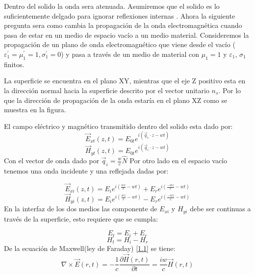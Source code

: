 \documentclass[a4paper,openright,12pt]{book}
\begin{document}
Dentro del solido la onda sera atenuada. Asumiremos que el solido es lo suficientemente delgado  para ignorar reflexiones internas \cite{SolidStatePhysics}. Ahora la siguiente pregunta sera como cambia la propagación de la onda electromagnética cuando pasa de estar en un medio de espacio vacío a un medio material. Consideremos la propagación de un plano de onda electromagnético que viene desde el vacío ($\varepsilon^{'}_{1}=\mu_{1}^{'}=1,\sigma_{1}^{'}=0$) y pasa a través de un medio de material con $\mu_{1}=1$ y $\varepsilon_{1}$, $\sigma_{1}$ finitos.

La superficie se encuentra en el plano XY, mientras que  el eje Z  positivo esta en la dirección normal hacia la superficie descrito por el vector unitario $n_{s}$. Por lo que la dirección de propagación de la onda estaría en el plano XZ como se muestra en la figura.

El campo eléctrico y magnético transmitido dentro del solido esta dado por:
\begin{equation}\label{Ei1}
\vec{E}_{xt}(z,t)=E_{0t}e^{i(\vec{q}_{i}\cdot z -wt)}
\end{equation}
\begin{equation}\label{Ei2}
\vec{H}_{yt}(z,t)=E_{0t}e^{i(\vec{q}_{i}\cdot z -wt)}
\end{equation}
Con el vector de onda dado por $\vec{q}_{i}=\frac{w}{c}\hat{N}$
Por otro lado en el espacio vacío tenemos una onda incidente y una reflejada dadas por:

\begin{equation}\label{Et1}
\vec{E}_{xi}(z,t)=E_{i}e^{i(\frac{wz}{c}-wt)}+E_{r}e^{i(\frac{-wz}{c}-wt)}
\end{equation}
\begin{equation}\label{Et2}
\vec{H}_{yi}(z,t)=E_{i}e^{i(\frac{wz}{c}-wt)}-E_{r}e^{i(\frac{-wz}{c}-wt)}
\end{equation}
En la interfaz de los dos medios las componente de $E_{xi}$ y $H_{yi}$ debe ser continuas a través de la superficie, esto requiere que se cumpla:

\begin{equation}\label{Ecuacioncondicion}
E_{t}=E_{i}+E_{r}
\end{equation}
\begin{equation}
H_{t}=H_{i}-H_{r}
\end{equation}
De la ecuación de Maxwell(ley de Faraday) \ref{1.1} se tiene:
\begin{equation}
\nabla\times \vec{E}(r,t)=-\frac{1}{c}\frac{\partial\vec{H}(r,t)}{\partial t}=\frac{iw}{c}\vec{H}(r,t)
\end{equation}
\end{document}
